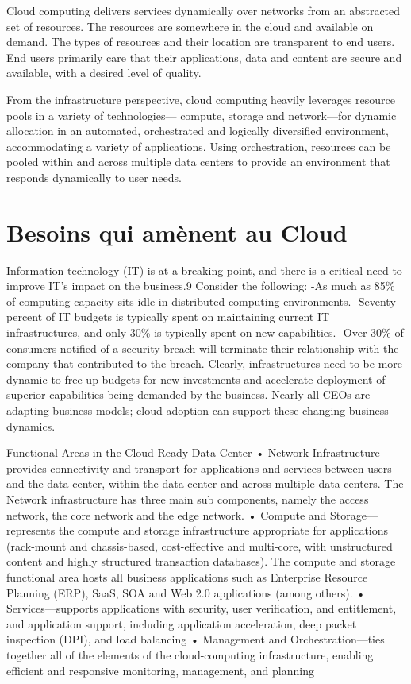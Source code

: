 Cloud computing delivers services dynamically over networks from an abstracted set of resources. The resources are somewhere in the cloud and available on demand. The types of resources and their location are transparent to end users. End users primarily care that their applications, data and content are secure and available, with a desired level of quality.


From the infrastructure perspective, cloud computing heavily leverages resource pools in a variety of technologies— compute, storage and network—for dynamic allocation in an automated, orchestrated and logically diversified environment, accommodating a variety of applications. Using orchestration, resources can be pooled within and across multiple data centers to provide an environment that responds dynamically to user needs.

\section{Besoins qui amènent au Cloud}

Information technology (IT) is at a breaking point, and there is a critical need to improve IT's impact on the business.9
Consider the following:
 -As much as 85\% of computing capacity sits idle in distributed computing environments.
 -Seventy percent of IT budgets is typically spent on maintaining current IT infrastructures, and only 30\% is typically spent on new capabilities.
 -Over 30\% of consumers notified of a security breach will terminate their relationship with the company that contributed to the breach.
Clearly, infrastructures need to be more dynamic to free up budgets for new investments and accelerate deployment of superior capabilities being demanded by the business. Nearly all CEOs are adapting business models; cloud adoption can support these changing business dynamics.

Functional Areas in the Cloud-Ready Data Center
• Network Infrastructure—provides connectivity and transport for applications and services between users and the data center, within the data center and across multiple data centers. The Network infrastructure has three main sub components, namely the access network, the core network and the edge network.
• Compute and Storage—represents the compute and storage infrastructure appropriate for applications (rack-mount and chassis-based, cost-effective and multi-core, with unstructured content and highly structured transaction databases). The compute and storage functional area hosts all business applications such as Enterprise Resource Planning (ERP), SaaS, SOA and Web 2.0 applications (among others).
• Services—supports applications with security, user verification, and entitlement, and application support, including application acceleration, deep packet inspection (DPI), and load balancing
• Management and Orchestration—ties together all of the elements of the cloud-computing infrastructure, enabling efficient and responsive monitoring, management, and planning


